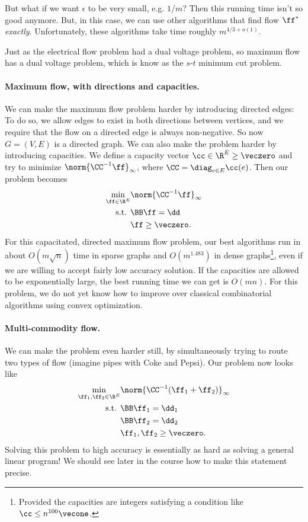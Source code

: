 But what if we want $\epsilon$ to be very small, e.g. $1/m$? Then this running
time isn't so good anymore.
But, in this case, we can use other algorithms that find flow $\ff^*$
\emph{exactly}. Unfortunately, these algorithms take time roughly $m^{4/3+o(1)}$.

Just as the electrical flow problem had a dual voltage problem, so
maximum flow has a dual voltage problem, which is know as the
$s$-$t$ minimum cut problem.

\paragraph{Maximum flow, with directions and capacities.}
We can make the maximum flow problem harder by introducing directed
edges: To do so, we allow edges to exist in both directions between vertices, and we require that the flow on a directed edge is
always non-negative. So now $G=(V,E)$ is a directed graph.
We can also make the problem harder by introducing capacities.
We define a capacity vector $\cc \in \R^E \geq \veczero$ and try to minimize $\norm{\CC^{-1} \ff}_{\infty}$, where $\CC =
\diag_{e \in E}\cc(e)$.
Then our problem becomes
\begin{align*}
\min_{\ff \in \R^E } & \norm{\CC^{-1} \ff}_{\infty} \\
  \textrm{s.t. } &  \BB \ff = \dd\\
                     &  \ff \geq \veczero.
\end{align*}
For this capacitated, directed maximum flow problem, our best
algorithms run in about $O( m \sqrt{n} )$ time in sparse graphs and $O(
m^{1.483} )$ in dense graphs\footnote{Provided the
  capacities are integers satisfying a condition like $\cc \leq n^{100} \vecone$.}, even if we are willing to
accept fairly low accuracy solution.
If the capacities are allowed to be exponentially large, the best
running time we can get is $O(m n)$.
For this problem, we do not yet know how to improve over classical
combinatorial algorithms using convex optimization.

\paragraph{Multi-commodity flow.}
We can make the problem even harder still, by simultaneously trying to route
two types of flow (imagine pipes with Coke and Pepsi).
Our problem now looks like
\begin{align*}
\min_{\ff_1, \ff_2 \in \R^E } & \norm{\CC^{-1} (\ff_1 + \ff_2)}_{\infty} \\
  \textrm{s.t. } &  \BB \ff_1 = \dd_1 \\
                              & \BB \ff_2 = \dd_2\\
                     &  \ff_1, \ff_2 \geq \veczero.
\end{align*}
Solving this problem to high accuracy is essentially as hard as
solving a general linear program! We should see later in the course
how to make this statement precise.

